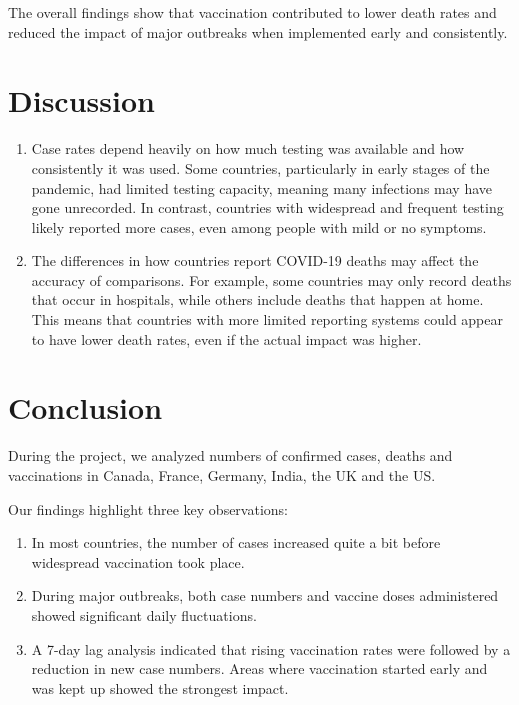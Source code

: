\documentclass[
  11pt,
]{article}
\begin{document}
The overall findings show that vaccination contributed to lower death
rates and reduced the impact of major outbreaks when implemented early
and consistently.

\section{Discussion}\label{sec-discussion}

\begin{enumerate}
\def\labelenumi{\arabic{enumi}.}
\item
  Case rates depend heavily on how much testing was available and how
  consistently it was used. Some countries, particularly in early stages
  of the pandemic, had limited testing capacity, meaning many infections
  may have gone unrecorded. In contrast, countries with widespread and
  frequent testing likely reported more cases, even among people with
  mild or no symptoms.
\item
  The differences in how countries report COVID-19 deaths may affect the
  accuracy of comparisons. For example, some countries may only record
  deaths that occur in hospitals, while others include deaths that
  happen at home. This means that countries with more limited reporting
  systems could appear to have lower death rates, even if the actual
  impact was higher.
\end{enumerate}

\section{Conclusion}\label{sec-conclusion}

During the project, we analyzed numbers of confirmed cases, deaths and
vaccinations in Canada, France, Germany, India, the UK and the US.

Our findings highlight three key observations:

\begin{enumerate}
\def\labelenumi{\arabic{enumi}.}
\item
  In most countries, the number of cases increased quite a bit before
  widespread vaccination took place.
\item
  During major outbreaks, both case numbers and vaccine doses
  administered showed significant daily fluctuations.
\item
  A 7-day lag analysis indicated that rising vaccination rates were
  followed by a reduction in new case numbers. Areas where vaccination
  started early and was kept up showed the strongest impact.
\end{enumerate}
\end{document}
